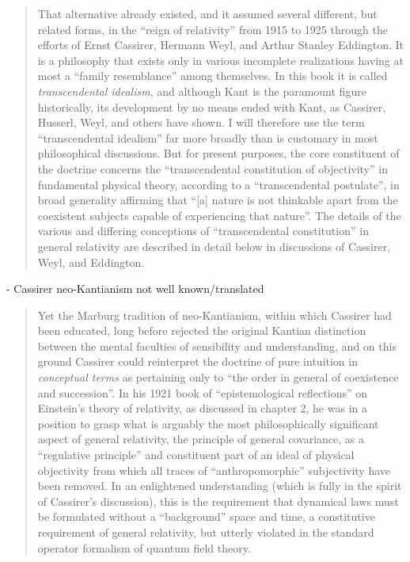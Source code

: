 \begin{quote}
    That alternative already existed, and it assumed several different, but related forms, in the ``reign of relativity'' from 1915 to 1925 through the efforts of Ernst Cassirer, Hermann Weyl, and Arthur Stanley Eddington.  It is a philosophy that exists only in various incomplete realizations having at most a ``family resemblance'' among themselves.  In this book it is called \emph{transcendental idealism}, and although Kant is the paramount figure historically, its development by no means ended with Kant, as Cassirer, Husserl, Weyl, and others have shown.  I will therefore use the term ``transcendental idealism'' far more broadly than is customary in most philosophical discussions.  But for present purposes, the core constituent of the doctrine concerns the ``transcendental constitution of objectivity'' in fundamental physical theory, according to a ``transcendental postulate'', in broad generality affirming that ``[a] nature is not thinkable apart from the coexistent subjects capable of experiencing that nature''.  The details of the various and differing conceptions of ``transcendental constitution'' in general relativity are described in detail below in discussions of Cassirer, Weyl, and Eddington.
    
    \citep[p. 5-6]{Ryckman2005}
\end{quote}

- Cassirer neo-Kantianism not well known/translated

\begin{quote}
    Yet the Marburg tradition of neo-Kantianism, within which Cassirer had been educated, long before rejected the original Kantian distinction between the mental faculties of sensibility and understanding, and on this ground Cassirer could reinterpret the doctrine of pure intuition in \emph{conceptual terms} as pertaining only to ``the order in general of coexistence and succession''.  In his 1921 book of ``epistemological reflections'' on Einstein's theory of relativity, as discussed in chapter 2, he was in a position to grasp what is arguably the most philosophically significant aspect of general relativity, the principle of general covariance, as a ``regulative principle'' and constituent part of an ideal of physical objectivity from which all traces of ``anthropomorphic'' subjectivity have been removed.  In an enlightened understanding (which is fully in the spirit of Cassirer's discussion), this is the requirement that dynamical laws must be formulated without a ``background'' space and time, a constitutive requirement of general relativity, but utterly violated in the standard operator formalism of quantum field theory.
    
    \citep[p. 7]{Ryckman2005}
\end{quote}


